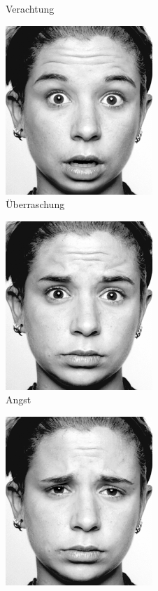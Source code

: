 \begin{figure}[htb]
\begin{subfigure}[b]{.30\linewidth}
		\caption{Verachtung}
		\label{fig:socialengineering:weiteretechniken:mikroexpressionen:verachtung}
	\end{subfigure}
	\begin{subfigure}[b]{.30\linewidth}
		\centering
		\includegraphics[width=0.5\linewidth]{images/mikroexpression-ueberraschung.png}
		\caption{Überraschung}
		\label{fig:socialengineering:weiteretechniken:mikroexpressionen:ueberraschung}
	\end{subfigure}
	\begin{subfigure}[b]{.30\linewidth}
		\centering
		\includegraphics[width=0.5\linewidth]{images/mikroexpression-angst.png}
		\caption{Angst}
		\label{fig:socialengineering:weiteretechniken:mikroexpressionen:angst}
	\end{subfigure}
	\begin{subfigure}[b]{.30\linewidth}
		\centering
		\includegraphics[width=0.5\linewidth]{images/mikroexpression-traurigkeit.png}

\end{subfigure}
\end{figure}
